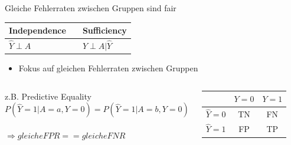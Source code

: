 \documentclass[aspectratio=169]{beamer}
\begin{document}
\begin{frame}[t]{Gleiche Fehlerraten zwischen Gruppen sind fair}
	\vspace*{0.3cm} %
	\begin{table}
        \begin{tabular}{lll}
            \toprule
            Independence & \color{orange}{Separation} & Sufficiency \\
            \midrule
            $\hat{Y} \perp A$ & \color{orange}{$\hat{Y} \perp A | Y$} & $Y \perp A | \hat{Y}$\\
            \bottomrule
        \end{tabular}
    \end{table}
	\begin{itemize}
		\item Fokus auf gleichen Fehlerraten zwischen Gruppen
	\end{itemize}
	\begin{columns}
		\centering
		z.B. Predictive Equality \cite{verma2018}
		$$P(\hat{Y} = 1 | A = a, Y = 0) = P(\hat{Y} = 1 | A = b, Y = 0)$$\\
		$\Rightarrow gleiche FPR == gleiche FNR$
		\begin{center}
			\renewcommand{\arraystretch}{1.5}  %
			\begin{tabular}{c|c|c|}
				& \color{orange}\(Y = 0\) & \color{orange}\(Y = 1\) \\
				\hline
				\(\hat{Y} = 0\) & TN & FN \\
				\hline
				\(\hat{Y} = 1\) & FP & TP \\
				\hline
			\end{tabular}
		\end{center}
	\end{columns}
\end{frame}
\end{document}
